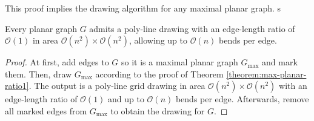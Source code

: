 This proof implies the drawing algorithm for any maximal planar graph.
s
\begin{theorem}
\end{theorem}
Every planar graph $G$ admits a poly-line drawing with an edge-length ratio of $\mathcal{O}(1)$ in area $\mathcal{O}(n^2)\times \mathcal{O}(n^2)$, allowing up to $\mathcal{O}(n)$ bends per edge.
\begin{proof}
	At first, add edges to $G$ so it is a maximal planar graph $G_{\max}$ and mark them. Then, draw $G_{\max}$ according to the proof of Theorem \ref{theorem:max-planar-ratio1}. The output is a poly-line grid drawing in area $\mathcal{O}(n^2)\times \mathcal{O}(n^2)$ with an edge-length ratio of $\mathcal{O}(1)$ and up to $\mathcal{O}(n)$ bends per edge. Afterwards, remove all marked edges from $G_{\max}$ to obtain the drawing for $G$.
\end{proof}